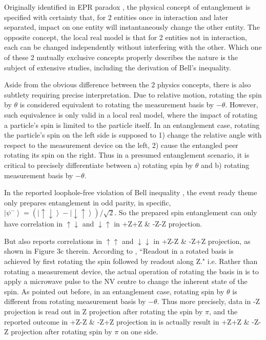 \documentclass[prd,showpacs,twocolumn]{revtex4-1}
\begin{document}
Originally identified in EPR paradox \cite{EPR}, the physical concept of entanglement is specified with certainty that, for 2 entities once in interaction and later separated, impact on one entity will instantaneously change the other entity. The opposite concept, the local real model is that for 2 entities not in interaction, each can be changed independently without interfering with the other. Which one of these 2 mutually exclusive concepts properly describes the nature is the subject of extensive studies, including the derivation of Bell's inequality.

Aside from the obvious difference between the 2 physics concepts, there is also subtlety requiring precise interpretation. Due to relative motion, rotating the spin by $\theta$ is considered equivalent to rotating the measurement basis by $-\theta$. However, such equivalence is only valid in a local real model, where the impact of rotating a particle's spin is limited to the particle itself. In an entanglement case, rotating the particle's spin on the left side is supposed to 1) change the relative angle with respect to the measurement device on the left, 2) cause the entangled peer rotating its spin on the right. Thus in a presumed entanglement scenario, it is critical to precisely differentiate between a) rotating spin by $\theta$ and b) rotating measurement basis by $-\theta$.

In the reported loophole-free violation of Bell inequality \cite{Hensen}, the event ready theme only prepares entanglement in odd parity, in specific,
$\left| \psi^- \right>=(\left|\uparrow\downarrow\right>-\left|\downarrow\uparrow\right>)/\sqrt{2}$. So the prepared spin entanglement can only have correlation in $\uparrow\downarrow$ and $\downarrow\uparrow$ in +Z+Z \& -Z-Z projection.

But \cite{Hensen} also reports correlations in $\uparrow\uparrow$ and $\downarrow\downarrow$ in +Z-Z \& -Z+Z projection, as shown in Figure 3c therein. According to \cite{Hensen}, ``Readout in a rotated basis is achieved by first rotating the spin followed by readout along Z." i.e. Rather than rotating a measurement device, the actual operation of rotating the basis in \cite{Hensen} is to apply a microwave pulse to the NV centre to change the inherent state of the spin. As pointed out before, in an entanglement case, rotating spin by $\theta$ is different from rotating measurement basis by $-\theta$. Thus more precisely, data in -Z projection is read out in Z projection after rotating the spin by $\pi$, and the reported outcome in +Z-Z \& -Z+Z projection in \cite{Hensen} is actually result in +Z+Z \& -Z-Z projection after rotating spin by $\pi$ on one side.
\end{document}
